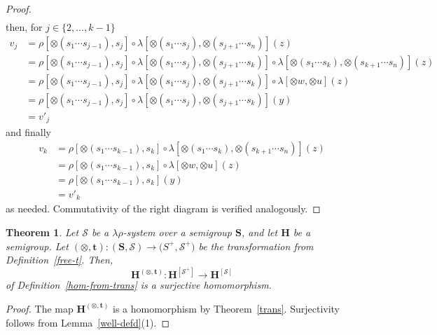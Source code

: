 \documentclass{amsart}
\newtheorem{theorem}{Theorem}
\begin{document}
\begin{proof}
\begin{align*}
\end{align*}
then, for $j\in\{2,\dots,k-1\}$
\begin{align*}
v_j &= \rho[\otimes(s_1\cdots s_{j-1}),s_j]\circ 
\lambda[\otimes(s_1\cdots s_j),\otimes(s_{j+1}\cdots s_n)](z)\\
&= \rho[\otimes(s_1\cdots s_{j-1}),s_j]\circ 
\lambda[\otimes(s_1\cdots s_j),\otimes(s_{j+1}\cdots s_k)] \circ 
\lambda[\otimes(s_1\cdots s_k),\otimes(s_{k+1}\cdots s_n)](z)\\
&= \rho[\otimes(s_1\cdots s_{j-1}),s_j]\circ 
\lambda[\otimes(s_1\cdots s_j),\otimes(s_{j+1}\cdots s_k)] \circ 
\lambda[\otimes w,\otimes u](z)\\  
&= \rho[\otimes(s_1\cdots s_{j-1}),s_j]\circ 
\lambda[\otimes(s_1\cdots s_j),\otimes(s_{j+1}\cdots s_k)](y)\\
&= v'_j
\end{align*}
and finally
\begin{align*}
v_k &= \rho[\otimes(s_1\cdots s_{k-1}), s_k]
\circ \lambda[\otimes(s_1\cdots s_k),\otimes(s_{k+1}\cdots s_n)](z)\\
&= \rho[\otimes(s_1\cdots s_{k-1}), s_k]
\circ \lambda[\otimes w,\otimes u](z)\\  
&= \rho[\otimes(s_1\cdots s_{k-1}),s_k](y)\\
&= v'_k
\end{align*}
as needed. Commutativity of the right diagram is verified analogously.
\end{proof}

\begin{theorem}\label{divide}
Let $\mathcal{S}$ be a $\lambda\rho$-system over a semigroup\/ $\mathbf{S}$, and
let\/ $\mathbf{H}$ be a semigroup. Let
$(\otimes,\mathbf{t})\colon
(\mathbf{S},\mathcal{S})\to \bigl(S^+,\mathcal{S}^+\bigr)$ 
be the transformation from Definition~\ref{free-t}. Then, 
$$
\mathbf{H}^{(\otimes,\mathbf{t})}\colon \mathbf{H}^{[\mathcal{S}^+]}
\to \mathbf{H}^{[\mathcal{S}]}
$$
of Definition~\ref{hom-from-trans} is a surjective homomorphism. 
\end{theorem}  

\begin{proof}
The map $\mathbf{H}^{(\otimes,\mathbf{t})}$ is a homomorphism by Theorem~\ref{trans}.
Surjectivity follows from Lemma~\ref{well-defd}(1). 
\end{proof}
\end{document}
